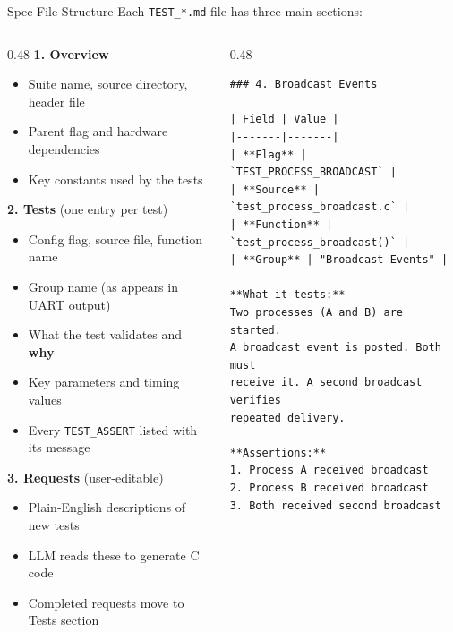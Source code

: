 \documentclass[aspectratio=169, 10pt]{beamer}
\begin{document}
\begin{frame}[fragile]{Spec File Structure}
Each \texttt{TEST\_*.md} file has three main sections:

\vspace{0.3em}
\begin{columns}[T]
\begin{column}{0.48\textwidth}
\textbf{1. Overview}
\begin{itemize}
  \item Suite name, source directory, header file
  \item Parent flag and hardware dependencies
  \item Key constants used by the tests
\end{itemize}

\vspace{0.5em}
\textbf{2. Tests} (one entry per test)
\begin{itemize}
  \item Config flag, source file, function name
  \item Group name (as appears in UART output)
  \item What the test validates and \textbf{why}
  \item Key parameters and timing values
  \item Every \texttt{TEST\_ASSERT} listed with its message
\end{itemize}

\vspace{0.5em}
\textbf{3. Requests} (user-editable)
\begin{itemize}
  \item Plain-English descriptions of new tests
  \item LLM reads these to generate C code
  \item Completed requests move to Tests section
\end{itemize}
\end{column}

\begin{column}{0.48\textwidth}
\begin{lstlisting}[basicstyle=\ttfamily\tiny, frame=single, backgroundcolor=\color{blue!3},
  title={Example: test entry in TEST\_PROCESS.md}]
### 4. Broadcast Events

| Field | Value |
|-------|-------|
| **Flag** | `TEST_PROCESS_BROADCAST` |
| **Source** | `test_process_broadcast.c` |
| **Function** | `test_process_broadcast()` |
| **Group** | "Broadcast Events" |

**What it tests:**
Two processes (A and B) are started.
A broadcast event is posted. Both must
receive it. A second broadcast verifies
repeated delivery.

**Assertions:**
1. Process A received broadcast
2. Process B received broadcast
3. Both received second broadcast
\end{lstlisting}
\end{column}
\end{columns}
\end{frame}
\end{document}
